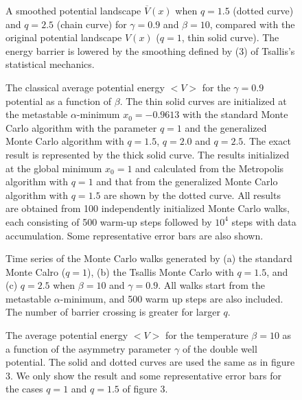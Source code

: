 \begin{figure}[th]
\epsfxsize=8cm
 \centerline{}
\caption{A smoothed potential landscape $\overline{V}(x)$  when $q=1.5$ (dotted curve) and $q=2.5$ (chain curve) for  $\gamma=0.9$ and $\beta=10$, compared with the original  potential landscape $V(x)$ ($q=1$, thin solid curve).  The energy barrier is lowered by the smoothing defined  by (3) of Tsallis's statistical mechanics.}
\label{fig:2}
\end{figure}

\begin{figure}[th]
\epsfxsize=8cm
 \centerline{}
\caption{The classical average potential energy $<V>$ for  the $\gamma=0.9$ potential as a function of $\beta$. The  thin solid curves are initialized at the  metastable $\alpha$-minimum $x_{0}=-0.9613$  with the standard Monte Carlo  algorithm with the parameter $q=1$ and the generalized Monte  Carlo algorithm with $q=1.5$, $q=2.0$ and $q=2.5$.  The exact result is represented by the thick solid  curve. The results initialized at the global minimum $x_{0}=1$  and calculated from the Metropolis algorithm with $q=1$ and that from  the generalized Monte Carlo algorithm with $q=1.5$ are shown  by the dotted curve. All results are obtained from 100 independently  initialized Monte Carlo walks, each consisting of 500 warm-up steps  followed by $10^{4}$ steps with data accumulation. Some  representative error bars are  also shown.}
\label{fig:3}
\end{figure}

\begin{figure}[th]
\epsfxsize=8cm
 \centerline{}
\vspace{4mm}
\epsfxsize=8cm
 \centerline{}
\vspace{4mm}
\epsfxsize=8cm
 \centerline{}
\caption{ Time series of the Monte Carlo walks generated by  (a) the standard Monte Calro ($q=1$), (b) the Tsallis Monte  Carlo with $q=1.5$, and (c) $q=2.5$ when $\beta=10$ and  $\gamma=0.9$. All walks start from the metastable  $\alpha$-minimum, and 500 warm up steps are also included.  The number of barrier crossing is greater for larger $q$.}
\label{fig:4}
\end{figure}

\begin{figure}[th]
\epsfxsize=8cm
 \centerline{}
\caption{The average potential energy $<V>$ for the temperature  $\beta=10$ as a function of the asymmetry parameter $\gamma$ of  the double well potential. The solid and dotted curves are used the same as in figure 3. We only show the result and some  representative error bars for the cases $q=1$ and $q=1.5$ of figure 3.}
\label{fig:5}
\end{figure}

